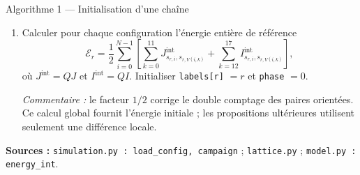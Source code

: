 \documentclass[10pt,a4paper]{article}
\begin{document}
\begin{algocode}{Algorithme 1 --- Initialisation d'une chaîne}
\begin{enumerate}
variantes 0 et 2. Les départs aléatoires de la seconde chaîne concernent
$T_r\ge1060$ K. Les départs froids ordonnés évitent de partir d'un état
aléatoire difficile à réorganiser à basse température ; ils ne dispensent
pas de vérifier l'équilibration.
\item Calculer pour chaque configuration l'énergie entière de référence
\[
\mathcal E_r=\frac12\sum_{i=0}^{N-1}
 \left[\sum_{k=0}^{11}J^{\mathrm{int}}_{s_{r,i},s_{r,V(i,k)}}
 +\sum_{k=12}^{17}I^{\mathrm{int}}_{s_{r,i},s_{r,V(i,k)}}\right],
\]
où $J^{\mathrm{int}}=QJ$ et $I^{\mathrm{int}}=QI$.
Initialiser \texttt{labels[r]} $=r$ et \texttt{phase} $=0$.
\par\textit{Commentaire :} le facteur $1/2$ corrige le double comptage des
paires orientées. Ce calcul global fournit l'énergie initiale ; les
propositions ultérieures utilisent seulement une différence locale.
\end{enumerate}
{\raggedright\textbf{Sources :} \texttt{simulation.py : load\_config, campaign} ;
\texttt{lattice.py} ; \texttt{model.py : energy\_int}.\par}
\end{algocode}
\end{document}
